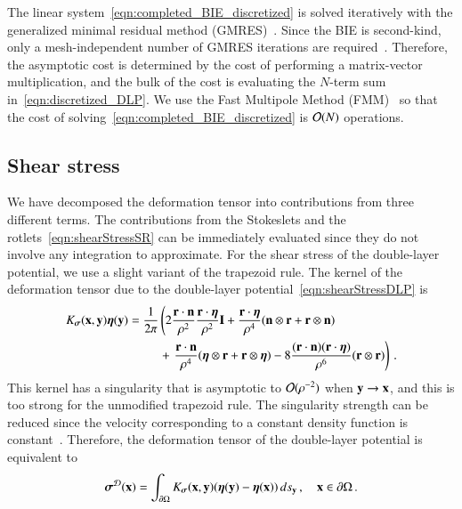 \documentclass[preprint, 10pt]{elsarticle}
\begin{document}
The linear system~\eqref{eqn:completed_BIE_discretized} is solved iteratively with the generalized minimal residual method (GMRES)~\cite{saa-sch1986}.  Since the BIE is second-kind, only a mesh-independent number of GMRES iterations are required~\cite{cam-ips-kel-mey-xue1996}.  Therefore, the asymptotic cost is determined by the cost of performing a matrix-vector multiplication, and the bulk of the cost is evaluating the $N$-term sum in~\eqref{eqn:discretized_DLP}. We use the Fast Multipole Method (FMM)~\cite{gre-rok1987, gre-gre-may1992} so that the cost of solving~\eqref{eqn:completed_BIE_discretized} is ${\mathcal{O}}(N)$ operations.
 
\subsection{Shear stress}
\label{sec:shearStress}
We have decomposed the deformation tensor into contributions from three different terms.  The contributions from the Stokeslets and the rotlets~\eqref{eqn:shearStressSR} can be immediately evaluated since they do not involve any integration to approximate.  For the shear stress of the double-layer potential, we use a slight variant of the trapezoid rule. The kernel of the deformation tensor due to the double-layer potential~\eqref{eqn:shearStressDLP} is 
\begin{equation}
\begin{aligned}
  K_{\boldsymbol\sigma}({\mathbf{x}},{\mathbf{y}}){\boldsymbol\eta}({\mathbf{y}}) &= \frac{1}{2\pi} \left(
    2\frac{{\mathbf{r}} \cdot {\mathbf{n}}}{\rho^2} \frac{{\mathbf{r}} \cdot {\boldsymbol\eta}}{\rho^2} {\mathbf{I}} + 
    \frac{{\mathbf{r}} \cdot {\boldsymbol\eta}}{\rho^4} ({\mathbf{n}} \otimes {\mathbf{r}} + {\mathbf{r}} \otimes {\mathbf{n}})
    \right. \\ & \hspace{25pt}+ \left.
    \frac{{\mathbf{r}} \cdot {\mathbf{n}}}{\rho^4} ({\boldsymbol\eta} \otimes {\mathbf{r}} + {\mathbf{r}} \otimes {\boldsymbol\eta}) - 
    8\frac{({\mathbf{r}} \cdot {\mathbf{n}})({\mathbf{r}} \cdot {\boldsymbol\eta})}{\rho^6}({\mathbf{r}} \otimes {\mathbf{r}})
  \right) \, .
\end{aligned}
\end{equation}
This kernel has a singularity that is asymptotic to ${\mathcal{O}}(\rho^{-2})$ when ${\mathbf{y}} \rightarrow {\mathbf{x}}$, and this is too strong for the unmodified trapezoid rule.  The singularity strength can be reduced since the velocity corresponding to a constant density function is constant~\cite{poz1992}.  Therefore, the deformation tensor of the double-layer potential is equivalent to
\begin{align}
  {\boldsymbol\sigma}^{{\mathcal{D}}}({\mathbf{x}}) = \int_{{\partial}\Omega}K_{\boldsymbol\sigma}({\mathbf{x}},{\mathbf{y}})
      ({\boldsymbol\eta}({\mathbf{y}}) - {\boldsymbol\eta}({\mathbf{x}})) \, ds_{{\mathbf{y}}}\, , \quad {\mathbf{x}} \in {\partial}\Omega \, .
\end{align}
\end{document}
